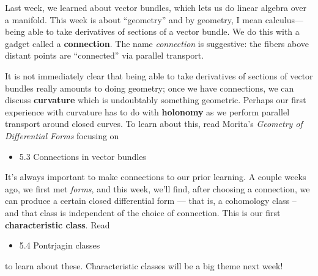 \documentclass{homework}
\author{Jim Fowler}
\date{Week 12: Geometry}
\begin{document}
\maketitle

Last week, we learned about vector bundles, which lets us do linear
algebra over a manifold.  This week is about ``geometry'' and by
geometry, I mean calculus---being able to take derivatives of sections
of a vector bundle.  We do this with a gadget called a
\textbf{connection}.  The name \textit{connection} is suggestive: the
fibers above distant points are ``connected'' via parallel transport.

It is not immediately clear that being able to take derivatives of
sections of vector bundles really amounts to doing geometry; once we
have connections, we can discuss \textbf{curvature} which is
undoubtably something geometric.  Perhaps our first experience with
curvature has to do with \textbf{holonomy} as we perform parallel
transport around closed curves.  To learn about this, read Morita's
\textit{Geometry of Differential Forms} focusing on
\begin{itemize}
\item 5.3 Connections in vector bundles
\end{itemize}

It's always important to make connections to our prior learning.  A
couple weeks ago, we first met \textit{forms}, and this week, we'll
find, after choosing a connection, we can produce a certain closed
differential form --- that is, a cohomology class -- and that class is
independent of the choice of connection.  This is our first
\textbf{characteristic class}.  Read
\begin{itemize}
\item 5.4 Pontrjagin classes
\end{itemize} to learn about these.  Characteristic classes will be a
big theme next week!
\end{document}
